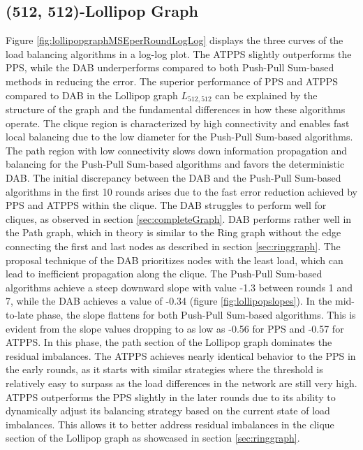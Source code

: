 \subsection{(512, 512)-Lollipop Graph}
Figure \ref{fig:lollipopgraphMSEperRoundLogLog} displays the three curves of the load balancing algorithms in a log-log plot. The ATPPS slightly outperforms the PPS, while the DAB underperforms compared to both Push-Pull Sum-based methods in reducing the error. The superior performance of PPS and ATPPS compared to DAB in the Lollipop graph $L_{512,512}$ can be explained by the structure of the graph and the fundamental differences in how these algorithms operate. The clique region is characterized by high connectivity and enables fast local balancing due to the low diameter for the Push-Pull Sum-based algorithms. The path region with low connectivity slows down information propagation and balancing for the Push-Pull Sum-based algorithms and favors the deterministic DAB. The initial discrepancy between the DAB and the Push-Pull Sum-based algorithms in the first 10 rounds arises due to the fast error reduction achieved by PPS and ATPPS within the clique. The DAB struggles to perform well for cliques, as observed in section \ref{sec:completeGraph}. DAB performs rather well in the Path graph, which in theory is similar to the Ring graph without the edge connecting the first and last nodes as described in section \ref{sec:ringgraph}. The proposal technique of the DAB prioritizes nodes with the least load, which can lead to inefficient propagation along the clique. The Push-Pull Sum-based algorithms achieve a steep downward slope with value -1.3 between rounds 1 and 7, while the DAB achieves a value of -0.34 (figure \ref{fig:lollipopslopes}). In the mid-to-late phase, the slope flattens for both Push-Pull Sum-based algorithms. This is evident from the slope values dropping to as low as -0.56 for PPS and -0.57 for ATPPS. In this phase, the path section of the Lollipop graph dominates the residual imbalances. The ATPPS achieves nearly identical behavior to the PPS in the early rounds, as it starts with similar strategies where the threshold is relatively easy to surpass as the load differences in the network are still very high. ATPPS outperforms the PPS slightly in the later rounds due to its ability to dynamically adjust its balancing strategy based on the current state of load imbalances. This allows it to better address residual imbalances in the clique section of the Lollipop graph as showcased in section \ref{sec:ringgraph}.

